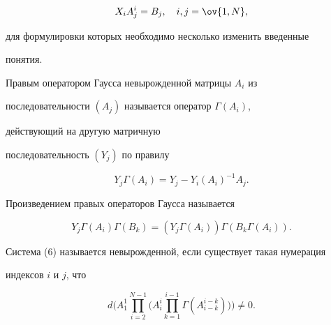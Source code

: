 \begin{equation} 


X_i A^i_j=B_j,\quad i,j=\ov{1,N}, 


\end{equation} 


для формулировки которых необходимо несколько изменить введенные 


понятия. 


 


\begin{defn} 


Правым оператором Гаусса невырожденной матрицы $A_i$ из 


последовательности $(A_j)$ называется оператор $\Gamma(A_i)$, 


действующий на другую матричную 


последовательность $(Y_j)$ по правилу 


$$ 


Y_j\Gamma(A_i)=Y_j-Y_i(A_i)^{-1}A_j. 


$$ 


\end{defn} 


 


\begin{defn} 


Произведением правых операторов Гаусса называется 


\begin{equation} 


Y_j\Gamma(A_i)\Gamma(B_k)=(Y_j\Gamma(A_i)) 


\Gamma(B_k\Gamma(A_i)). 


\end{equation} 


\end{defn} 


 


\begin{defn} 


Система (6) называется невырожденной, если существует такая нумерация 


индексов $i$ и $j$, что 


\begin{equation} 


d\bigg(A^1_1\prod^{N-1}_{i=2}\bigg(A^i_i


\prod^{i-1}_{k=1}\Gamma(A^{i-k}_{i-k})\bigg)\bigg)\ne 0. 


\end{equation} 


\end{defn} 


